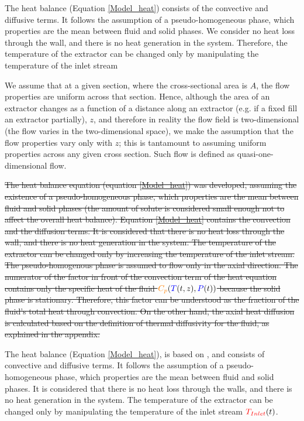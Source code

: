 \documentclass[../Article_Model_Parameters.tex]{subfiles}
\begin{document}
		\iffalse
		 {\color{red}
			The heat balance (Equation \ref{Model_heat}) consists of the convective and diffusive terms. It follows the assumption of a pseudo-homogeneous phase, which properties are the mean between fluid and solid phases. We consider no heat loss through the wall, and there is no heat generation in the system. Therefore, the temperature of the extractor can be changed only by manipulating the temperature of the inlet stream %
			
			We assume that at a given section, where the cross-sectional area is $A$, the flow properties are uniform across that section. Hence, although the area of an extractor changes  as a function of a distance along an extractor (e.g. if a fixed fill an extractor partially), $z$, and therefore in reality the flow field is two-dimensional (the flow varies in the two-dimensional space), we make the assumption that the flow properties vary only with $z$; this is tantamount to assuming uniform properties across any given cross section. Such flow is defined as quasi-one-dimensional flow.
			
		}
		
		\sout{The heat balance equation (equation  \ref{Model_heat}) was developed, assuming the existence of a pseudo-homogeneous phase, which properties are the mean between fluid and solid phases (the amount of solute is considered small enough not to affect the overall heat balance). Equation \ref{Model_heat} contains the convection and the diffusion terms. It is considered that there is no heat loss through the wall, and there is no heat generation in the system. The temperature of the extractor can be changed only by increasing the temperature of the inlet stream. The pseudo-homogenous phase is assumed to flow only in the axial direction. The numerator of the factor in front of the convection term of the heat equation contains only the specific heat of the fluid ${\color{orange}C_p}({\color{blue}T}(t,z),{\color{blue}P}(t))$ because the solid phase is stationary. Therefore, this factor can be understood as the fraction of the fluid's total heat through convection. On the other hand, the axial heat diffusion is calculated based on the definition of thermal diffusivity for the fluid, as explained in the appendix. }
			
		{\color{blue} The heat balance (Equation \ref{Model_heat}), is based on \citet{Srinivasan2012}, and consists of convective and diffusive terms. It follows the assumption of a pseudo-homogeneous phase, which properties are the mean between fluid and solid phases. It is considered that there is no heat loss through the walls, and there is no heat generation in the system. The temperature of the extractor can be changed only by manipulating the temperature of the inlet stream ${\color{red}T_{Inlet}}(t)$.
			}
			
\end{document}
